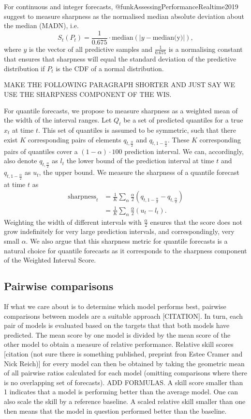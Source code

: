 \documentclass[article]{jss}
\begin{document}
For continuous and integer forecasts, @funkAssessingPerformanceRealtime2019 suggest to measure sharpness as the normalised median absolute deviation about the median (MADN), i.e. 
$$ S_t(P_t) = \frac{1}{0.675} \cdot \text{median}(|y - \text{median(y)}|), $$ 
where $y$ is the vector of all predictive samples and $\frac{1}{0.675}$ is a normalising constant that ensures that sharpness will equal the standard deviation of the predictive distribution if $P_t$ is the CDF of a normal distribution. 

MAKE THE FOLLOWING PARAGRAPH SHORTER AND JUST SAY WE USE THE SHARPNESS COMPONENT OF THE WIS. 

For quantile forecasts, we propose to measure sharpness as a weighted mean of the width of the interval ranges. Let $Q_t$ be a set of predicted quantiles for a true $x_t$ at time $t$. This set of quantiles is assumed to be symmetric, such that there exist $K$ corresponding pairs of elements $q_{t, \frac{\alpha}{2}}$ and $q_{t, 1-\frac{\alpha}{2}}$. These $K$ corresponding pairs of quantiles cover a $(1 - \alpha) \cdot 100$ prediction interval. We can, accordingly, also denote $q_{t, \frac{\alpha}{2}}$ as $l_t$ the lower bound of the prediction interval at time $t$ and $q_{t, 1-\frac{\alpha}{2}}$ as $u_t$, the upper bound. We measure the sharpness of a quantile forecast at time $t$ as
\begin{align*}
\text{sharpness}_t &= \frac{1}{K} \sum_{\alpha} \frac{\alpha}{2} (q_{t, 1 - \frac{\alpha}{2}} - q_{t, \frac{\alpha}{2}}) \\
                   &= \frac{1}{K} \sum_{\alpha} \frac{\alpha}{2} (u_t - l_t).
\end{align*}
Weighting the width of different intervals with $\frac{\alpha}{2}$ ensures that the score does not grow indefinitely for very large prediction intervals, and correspondingly, very small $\alpha$. We also argue that this sharpness metric for quantile forecasts is a natural choice for quantile forecasts as it corresponds to the sharpness component of the Weighted Interval Score.

\subsection{Pairwise comparisons} 

If what we care about is to determine which model performs best, pairwise comparisons between models are a suitable approach [CITATION]. In turn, each pair of models is evaluated based on the targets that that both models have predicted. The mean score by one model is divided by the mean score of the other model to obtain a measure of relative performance. Relative skill scores [citation (not sure there is something published, preprint fron Estee Cramer and Nick Reich)] for every model can then be obtained by taking the geometric mean of all pairwise ratios calculated for each model (omitting comparisons where there is no overlapping set of forecasts). ADD FORMULAS. A skill score smaller than 1 indicates that a model is performing better than the average model. One can also scale the skill by a reference baseline. A scaled relative skill smaller than one then means that the model in question performed better than the baseline. 
\end{document}
